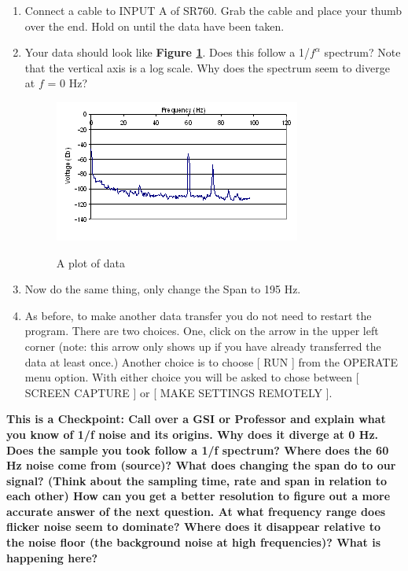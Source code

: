 \documentclass{../lab}
\begin{document}
\begin{enumerate}
\begin{enumerate}
    \end{enumerate}

    \item Connect a cable to INPUT A of SR760. Grab the cable and place your thumb over the end. Hold on until the data have been taken.

    \item Your data should look like \textbf{Figure \ref{fig:LLSimage019}}. Does this follow a 1/$f^\alpha$ spectrum? Note that the vertical axis is a log scale. Why does the spectrum seem to diverge at $f$ = 0 Hz?
    \begin{figure}[h]
        \centering
        \href{http://experimentationlab.berkeley.edu/sites/default/files/images/LLSimage019.gif}{\includegraphics[width=0.5\linewidth]{images/LLSimage019.png}}
        \caption{A plot of data}
        \label{fig:LLSimage019}
    \end{figure}

    \item Now do the same thing, only change the Span to 195 Hz.

    \item As before, to make another data transfer you do not need to restart the program. There are two choices. One, click on the arrow in the upper left corner (note: this arrow only shows up if you have already transferred the data at least once.) Another choice is to choose [ RUN ] from the OPERATE menu option. With either choice you will be asked to chose between [ SCREEN CAPTURE ] or [ MAKE SETTINGS REMOTELY ].

\end{enumerate}


\textbf{This is a Checkpoint: Call over a GSI or Professor and explain what you know of 1/f noise and its origins. Why does it diverge at 0 Hz. Does the sample you took follow a 1/f spectrum? Where does the 60 Hz noise come from (source)? What does changing the span do to our signal? (Think about the sampling time, rate and span in relation to each other) How can you get a better resolution to figure out a more accurate answer of the next question. At what frequency range does flicker noise seem to dominate? Where does it disappear relative to the noise floor (the background noise at high frequencies)? What is happening here? }
\end{document}
